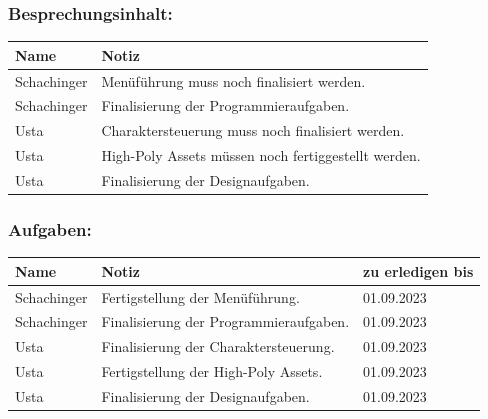 \subsubsection*{Besprechungsinhalt:}
\begin{tabular}{|m{}|m{}|}
\hline
Name & Notiz \\
\hline
Schachinger & Menüführung muss noch finalisiert werden. \\
\hline
Schachinger & Finalisierung der Programmieraufgaben. \\
\hline
Usta & Charaktersteuerung muss noch finalisiert werden. \\
\hline
Usta & High-Poly Assets müssen noch fertiggestellt werden. \\
\hline
Usta & Finalisierung der Designaufgaben. \\
\hline
\end{tabular}

\subsubsection*{Aufgaben:}
\begin{tabular}{|m{}|m{}|m{}|}
\hline
Name & Notiz & zu erledigen bis \\
\hline
Schachinger & Fertigstellung der Menüführung. & 01.09.2023 \\
\hline
Schachinger & Finalisierung der Programmieraufgaben. & 01.09.2023 \\
\hline
Usta & Finalisierung der Charaktersteuerung.  & 01.09.2023 \\
\hline
Usta & Fertigstellung der High-Poly Assets. & 01.09.2023 \\
\hline
Usta & Finalisierung der Designaufgaben. & 01.09.2023 \\
\hline
\end{tabular}